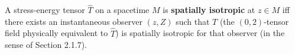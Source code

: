 A stress-energy tensor $\hat{T}$ on a spacetime $M$ is \textbf{spatially isotropic} at $z \in M$ iff there exists an instantaneous observer $(z, Z)$ such that $T$ (the $(0,2)$-tensor field physically equivalent to $\hat{T}$) is spatially isotropic for that observer (in the sense of Section 2.1.7).
